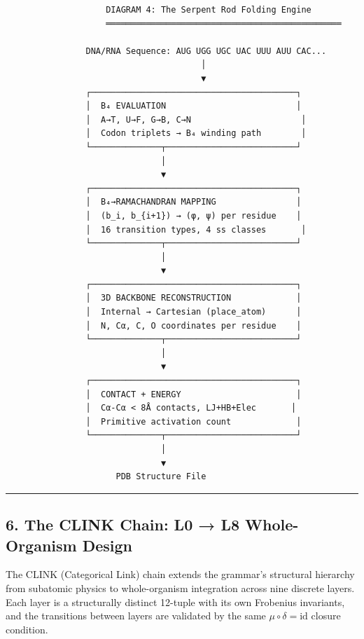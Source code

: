 \documentclass[12pt,a4paper]{article}
\begin{document}
\begin{verbatim}
                    DIAGRAM 4: The Serpent Rod Folding Engine
                    ═══════════════════════════════════════════════

                DNA/RNA Sequence: AUG UGG UGC UAC UUU AUU CAC...
                                       │
                                       ▼
                ┌─────────────────────────────────────────┐
                │  B₄ EVALUATION                          │
                │  A→T, U→F, G→B, C→N                      │
                │  Codon triplets → B₄ winding path        │
                └──────────────┬──────────────────────────┘
                               │
                               ▼
                ┌─────────────────────────────────────────┐
                │  B₄→RAMACHANDRAN MAPPING                │
                │  (b_i, b_{i+1}) → (φ, ψ) per residue    │
                │  16 transition types, 4 ss classes       │
                └──────────────┬──────────────────────────┘
                               │
                               ▼
                ┌─────────────────────────────────────────┐
                │  3D BACKBONE RECONSTRUCTION             │
                │  Internal → Cartesian (place_atom)      │
                │  N, Cα, C, O coordinates per residue    │
                └──────────────┬──────────────────────────┘
                               │
                               ▼
                ┌─────────────────────────────────────────┐
                │  CONTACT + ENERGY                       │
                │  Cα-Cα < 8Å contacts, LJ+HB+Elec       │
                │  Primitive activation count             │
                └──────────────┬──────────────────────────┘
                               │
                               ▼
                      PDB Structure File
\end{verbatim}

\begin{center}\rule{0.5\linewidth}{0.5pt}\end{center}

\hypertarget{the-clink-chain-l0-l8-whole-organism-design}{%
\subsection{6. The CLINK Chain: L0 → L8 Whole-Organism
Design}\label{the-clink-chain-l0-l8-whole-organism-design}}

The CLINK (Categorical Link) chain extends the grammar's structural
hierarchy from subatomic physics to whole-organism integration across
nine discrete layers. Each layer is a structurally distinct 12-tuple
with its own Frobenius invariants, and the transitions between layers
are validated by the same \(\mu \circ \delta = \text{id}\) closure
condition.
\end{document}
